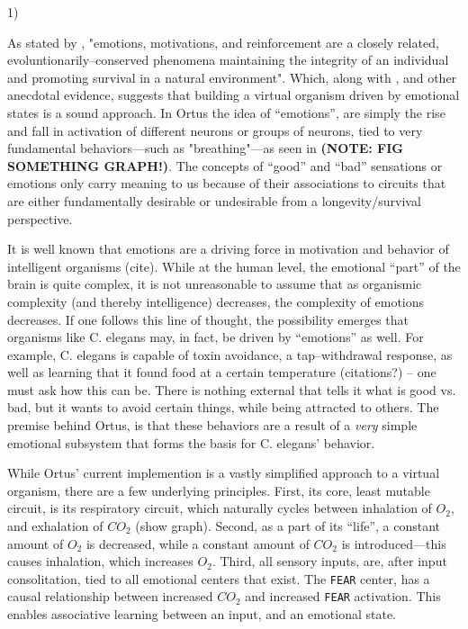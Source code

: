 \documentclass[letterpaper]{article}
\begin{document}
1)

As stated by \cite{Verma2015}, "emotions, motivations, and reinforcement are a closely related, evoluntionarily--conserved phenomena maintaining the integrity of an individual and promoting survival in a natural environment". Which, along with \cite{Gore2015}, and other anecdotal evidence, suggests that building a virtual organism driven by emotional states is a sound approach. In Ortus the idea of ``emotions'', are simply the rise and fall in activation of different neurons or groups of neurons, tied to very fundamental behaviors---such as "breathing"---as seen in \textbf{(NOTE: FIG SOMETHING GRAPH!)}. The concepts of ``good'' and ``bad'' sensations or emotions only carry meaning to us because of their associations to circuits that are either fundamentally desirable or undesirable from a longevity/survival perspective.

It is well known that emotions are a driving force in motivation and behavior of intelligent organisms (cite). While at the human level, the emotional ``part'' of the brain is quite complex, it is not unreasonable to assume that as organismic complexity (and thereby intelligence) decreases, the complexity of emotions decreases. If one follows this line of thought, the possibility emerges that organisms like C. elegans may, in fact, be driven by ``emotions'' as well. For example, C. elegans is capable of toxin avoidance, a tap--withdrawal response, as well as learning that it found food at a certain temperature (citations?) -- one must ask how this can be. There is nothing external that tells it what is good vs. bad, but it wants to avoid certain things, while being attracted to others. The premise behind Ortus, is that these behaviors are a result of a \textit{very} simple emotional subsystem that forms the basis for C. elegans' behavior.

While Ortus' current implemention is a vastly simplified approach to a virtual organism, there are a few underlying principles. First, its core, least mutable circuit, is its respiratory circuit, which naturally cycles between inhalation of $O_2$, and exhalation of $CO_2$ (show graph). Second, as a part of its ``life'', a constant amount of $O_2$ is decreased, while a constant amount of $CO_2$ is introduced---this causes inhalation, which increases $O_2$. Third, all sensory inputs, are, after input consolitation, tied to all emotional centers that exist. The \texttt{FEAR} center, has a causal relationship between increased $CO_2$ and increased \texttt{FEAR} activation. This enables associative learning between an input, and an emotional state.
\end{document}
